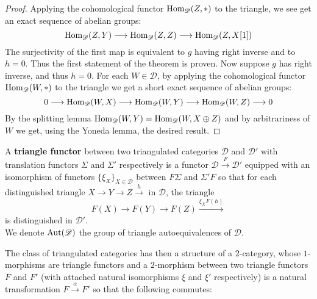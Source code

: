 \begin{proof}
Applying the cohomological functor $\textnormal{Hom}_{\mathscr{D}}(Z,*)$ to the triangle, we see get an exact sequence of abelian groups: $$\textnormal{Hom}_{\mathscr{D}}(Z,Y) \longrightarrow \textnormal{Hom}_{\mathscr{D}}(Z,Z) \longrightarrow \textnormal{Hom}_{\mathscr{D}}(Z,X[1])$$ The surjectivity of the first map is equivalent to $g$ having right inverse and to $h=0$. Thus the first statement of the theorem is proven. Now suppose $g$ has right inverse, and thus $h=0$. For each $W \in \mathscr{D}$, by applying the cohomological functor $\textnormal{Hom}_{\mathscr{D}}(W,*)$ to the triangle we get a short exact sequence of abelian groups: $$0 \longrightarrow \textnormal{Hom}_{\mathscr{D}}(W,X) \longrightarrow \textnormal{Hom}_{\mathscr{D}}(W,Y) \longrightarrow \textnormal{Hom}_{\mathscr{D}}(W,Z) \longrightarrow 0$$
By the splitting lemma $\textnormal{Hom}_{\mathscr{D}}(W,Y)=\textnormal{Hom}_{\mathscr{D}}(W,X \oplus Z)$ and by arbitrariness of $W$ we get, using the Yoneda lemma, the desired result. 
\end{proof}

\begin{defn}
A \textbf{triangle functor} between two triangulated categories $\mathscr{D}$ and $\mathscr{D}'$ with translation functors $\Sigma$ and $\Sigma'$ respectively is a functor $\mathscr{D} \overset{F}{\longrightarrow} \mathscr{D}'$ equipped with an isomorphism of functors $\{ \xi_X \}_{X \in \mathscr{D}}$ between $F \Sigma$ and $\Sigma'F$ so that for each distinguished triangle $X \longrightarrow Y \longrightarrow Z \overset{h}{\longrightarrow}$ in $\mathscr{D}$, the triangle $$F(X) \longrightarrow F(Y) \longrightarrow F(Z) \overset{\xi_X F(h)}{\longrightarrow}$$ is distinguished in $\mathscr{D}'$. \\
We denote $\textnormal{Aut}(\mathscr{D})$ the group of triangle autoequivalences of $\mathscr{D}$. 
\end{defn}

The class of triangulated categories has then a structure of a $2$-category, whose $1$-morphisms are triangle functors and a $2$-morphism between two triangle functors $F$ and $F'$ (with attached natural isomorphisms $\xi$ and $\xi'$ respectively) is a natural transformation $F \overset{\alpha}{\longrightarrow} F'$ so that the following commutes: 
\begin{center}
\end{center}

